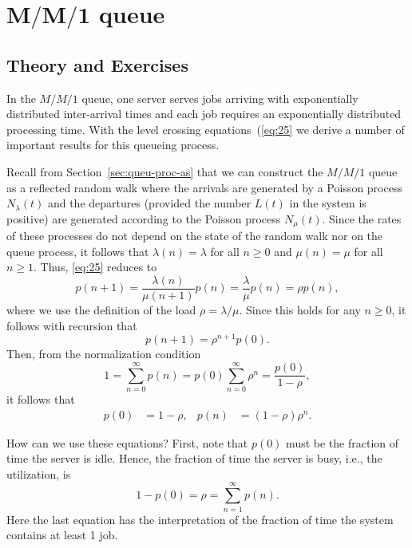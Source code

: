 \section
[$M/M/1$ queue]
{$\mathbf{M/M/1}$ queue}
\label{sec:mm1}


\subsection*{Theory and Exercises}


In the $M/M/1$ queue, one server serves jobs arriving with exponentially distributed inter-arrival times and each job requires an exponentially distributed processing time.
With the level crossing equations~(\ref{eq:25} we  derive a number of important results for this queueing process.

Recall from Section~\ref{sec:queu-proc-as} that we can construct the
$M/M/1$ queue as a reflected random walk where the arrivals are
generated by a Poisson process $N_\lambda(t)$ and the departures
(provided the number $L(t)$ in the system is positive) are generated according to the
Poisson process $N_\mu(t)$. Since the rates of these processes do not
depend on the state of the random walk nor on  the queue process, it follows that
$\lambda(n)=\lambda$ for all $n \geq 0$ and $\mu(n)=\mu$ for all $n \geq 1$. Thus, \eqref{eq:25}
reduces to
\begin{equation*}
  p(n+1) = \frac{\lambda(n)}{\mu(n+1)} p(n) = \frac{\lambda}{\mu} p(n) = \rho p(n),
\end{equation*}
where we use the definition of the load $\rho=\lambda/\mu$. Since this
holds for any $n\geq 0$, it follows with recursion that
\begin{equation*}
  p(n+1) = \rho^{n+1} p(0).
\end{equation*}
Then, from the normalization condition
\begin{equation*}
1=  \sum_{n=0}^\infty p(n) = p(0)\sum_{n=0}^\infty \rho^n = \frac{p(0)}{1-\rho},
\end{equation*}
it follows that
\begin{align}\label{eq:23}
p(0) &=1-\rho, &   p(n) &=  (1-\rho)\rho^{n}.
\end{align}

How can we use these equations? First, note that $p(0)$ must be the
fraction of time the server is idle. Hence, the fraction of time the
server is busy, i.e., the utilization, is
\begin{equation*}
  1-p(0) = \rho = \sum_{n=1}^\infty p(n).
\end{equation*}
Here the last equation has the interpretation of the fraction of time
the system contains at least 1 job. 


